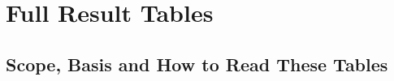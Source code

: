 \chapter{Full Result Tables}
\label{app:fullresults}




\FloatBarrier
\section{Scope, Basis and How to Read These Tables}
\label{app:res-basis}


